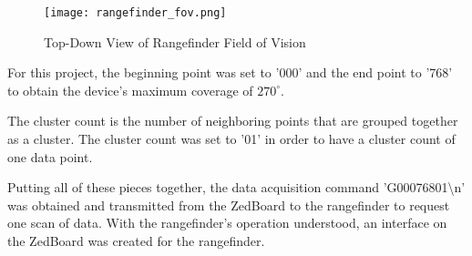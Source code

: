 \begin{figure}[H]
	\centerline{\texttt{[image: rangefinder\_fov.png]}}
	\caption{Top-Down View of Rangefinder Field of Vision \cite{urg04lx_datasheet}}
	\label{rangefinder_fov}
\end{figure}

For this project, the beginning point was set to '000' and the end point to '768' to obtain the device's maximum coverage of $270^\circ$.
\par
The cluster count is the number of neighboring points that are grouped together as a cluster. The cluster count was set to '01' in order to have a cluster count of one data point.
\par
Putting all of these pieces together, the data acquisition command 'G00076801\textbackslash{}n' was obtained and transmitted from the ZedBoard to the rangefinder to request one scan of data. With the rangefinder's operation understood, an interface on the ZedBoard was created for the rangefinder.




